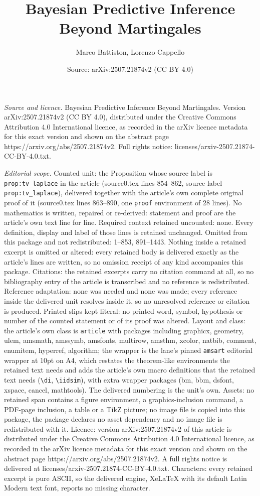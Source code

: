 \documentclass[10pt,a4paper]{amsart}
\title[Bayesian Predictive Inference Beyond Martingales]{Bayesian Predictive Inference Beyond Martingales}
\author{Marco Battiston, Lorenzo Cappello}
\date{Source: arXiv:2507.21874v2 (CC BY 4.0)}
\begin{document}
\maketitle

\noindent\emph{Source and licence.} Bayesian Predictive Inference Beyond Martingales. Version arXiv:2507.21874v2 (CC BY 4.0), distributed under the Creative Commons Attribution 4.0 International licence, as recorded in the arXiv licence metadata for this exact version and shown on the abstract page https://arxiv.org/abs/2507.21874v2. Full rights notice: licenses/arxiv-2507.21874-CC-BY-4.0.txt.\par\smallskip

\noindent\textit{Editorial scope.} Counted unit: the Proposition whose source label is \texttt{prop:tv\_laplace} in the article (source0.tex lines 854--862, source label \texttt{prop:tv\_laplace}), delivered together with the article's own complete original proof of it (source0.tex lines 863--890, one \texttt{proof} environment of 28 lines). No mathematics is written, repaired or re-derived: statement and proof are the article's own text line for line. Required context retained uncounted: none. Every definition, display and label of those lines is retained unchanged. Omitted from this package and not redistributed: 1--853, 891--1443. Nothing inside a retained excerpt is omitted or altered: every retained body is delivered exactly as the article's lines are written, so no omission receipt of any kind accompanies this package. Citations: the retained excerpts carry no citation command at all, so no bibliography entry of the article is transcribed and no reference is redistributed. Reference adaptation: none was needed and none was made; every reference inside the delivered unit resolves inside it, so no unresolved reference or citation is produced. Printed slips kept literal: no printed word, symbol, hypothesis or number of the counted statement or of its proof was altered. Layout and class: the article's own class is \texttt{article} with packages including graphicx, geometry, ulem, amsmath, amssymb, amsfonts, multirow, amsthm, xcolor, natbib, comment, enumitem, hyperref, algorithm; the wrapper is the lane's pinned \texttt{amsart} editorial wrapper at 10pt on A4, which restates the theorem-like environments the retained text needs and adds the article's own macro definitions that the retained text needs (\texttt{\textbackslash di}, \texttt{\textbackslash iidsim}), with extra wrapper packages (bm, bbm, dsfont, xspace, cancel, mathtools). The delivered numbering is the unit's own. Assets: no retained span contains a figure environment, a graphics-inclusion command, a PDF-page inclusion, a table or a TikZ picture; no image file is copied into this package, the package declares no asset dependency and no image file is redistributed with it. Licence: version arXiv:2507.21874v2 of this article is distributed under the Creative Commons Attribution 4.0 International licence, as recorded in the arXiv licence metadata for this exact version and shown on the abstract page https://arxiv.org/abs/2507.21874v2. A full rights notice is delivered at licenses/arxiv-2507.21874-CC-BY-4.0.txt. Characters: every retained excerpt is pure ASCII, so the delivered engine, XeLaTeX with its default Latin Modern text font, reports no missing character.
\end{document}
